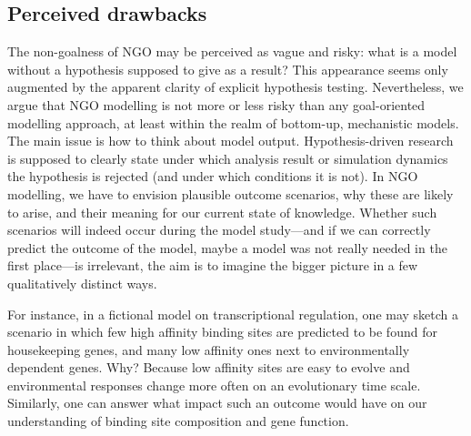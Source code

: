\subsection{Perceived drawbacks}

The non-goalness of NGO may be perceived as vague and risky: what is a model without a hypothesis supposed to give as a result? This appearance seems only augmented by the apparent clarity of explicit hypothesis testing. Nevertheless, we argue that NGO modelling is not more or less risky than any goal-oriented modelling approach, at least within the realm of bottom-up, mechanistic models. The main issue is how to think about model output. Hypothesis-driven research is supposed to clearly state under which analysis result or simulation dynamics the hypothesis is rejected (and under which conditions it is not). In NGO modelling, we have to envision plausible outcome scenarios, why these are likely to arise, and their meaning for our current state of knowledge. Whether such scenarios will indeed occur during the model study---and if we can correctly predict the outcome of the model, maybe a model was not really needed in the first place---is irrelevant, the aim is to imagine the bigger picture in a few qualitatively distinct ways.

For instance, in a fictional model on transcriptional regulation, one may sketch a scenario in which few high affinity binding sites are predicted to be found for housekeeping genes, and many low affinity ones next to environmentally dependent genes. Why? Because low affinity sites are easy to evolve and environmental responses change more often on an evolutionary time scale. Similarly, one can answer what impact such an outcome would have on our understanding of binding site composition and gene function.